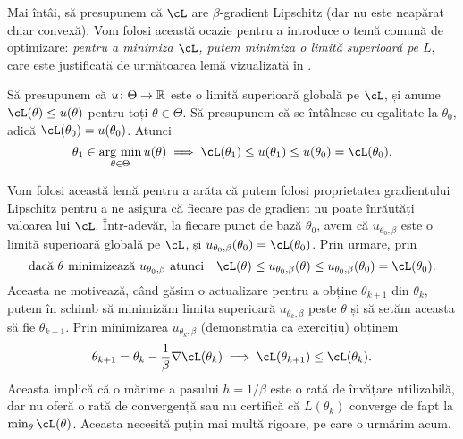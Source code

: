 \documentclass[../../book-main_ro.tex]{subfiles}
\begin{document}
Mai întâi, să presupunem că \(\cL\) are \(\beta\)-gradient Lipschitz (dar nu este neapărat chiar convexă). Vom folosi această ocazie pentru a introduce o temă comună de optimizare: \textit{pentru a minimiza \(\cL\), putem minimiza o limită superioară pe \(L\)}, care este justificată de următoarea lemă vizualizată în .
\begin{lemma}\label{lem:majorization_minimization}
    Să presupunem că \(u \colon \Theta \to \mathbb{R}\) este o limită superioară globală pe \(\cL\), și anume \(\cL(\theta) \leq u(\theta)\) pentru toți \(\theta \in \Theta\). Să presupunem că se întâlnesc cu egalitate la \(\theta_{0}\), adică \(\cL(\theta_{0}) = u(\theta_{0})\). Atunci
    \begin{equation}
        \theta_{1} \in \argmin_{\theta \in \Theta}u(\theta) \implies \cL(\theta_{1}) \leq u(\theta_{1}) \leq u(\theta_{0}) = \cL(\theta_{0}).
    \end{equation}
\end{lemma}

Vom folosi această lemă pentru a arăta că putem folosi proprietatea gradientului Lipschitz pentru a ne asigura că fiecare pas de gradient nu poate înrăutăți valoarea lui \(\cL\). Într-adevăr, la fiecare punct de bază \(\theta_{0}\), avem că \(u_{\theta_{0}, \beta}\) este o limită superioară globală pe \(\cL\), și \(u_{\theta_{0}, \beta}(\theta_{0}) = \cL(\theta_{0})\). Prin urmare, prin 
\begin{equation}
    \text{dacă \(\theta\) minimizează \(u_{\theta_{0}, \beta}\) atunci} \quad \cL(\theta) \leq u_{\theta_{0}, \beta}(\theta) \leq u_{\theta_{0}, \beta}(\theta_{0}) = \cL(\theta_{0}).
\end{equation}
Aceasta ne motivează, când găsim o actualizare pentru a obține \(\theta_{k + 1}\) din \(\theta_{k}\), putem în schimb să minimizăm limita superioară \(u_{\theta_{k}, \beta}\) peste \(\theta\) și să setăm aceasta să fie \(\theta_{k + 1}\). Prin minimizarea \(u_{\theta_{k}, \beta}\) (demonstrația ca exercițiu) obținem
\begin{equation}\label{eq:GD}
    \theta_{k + 1} = \theta_{k} - \frac{1}{\beta}\nabla \cL(\theta_{k}) \implies \cL(\theta_{k + 1}) \leq \cL(\theta_{k}).
\end{equation}
Aceasta implică că o mărime a pasului \(h = 1/\beta\) este o rată de învățare utilizabilă, dar nu oferă o rată de convergență sau nu certifică că \(L(\theta_{k})\) converge de fapt la \(\min_{\theta}\cL(\theta)\). Aceasta necesită puțin mai multă rigoare, pe care o urmărim acum.
\end{document}
